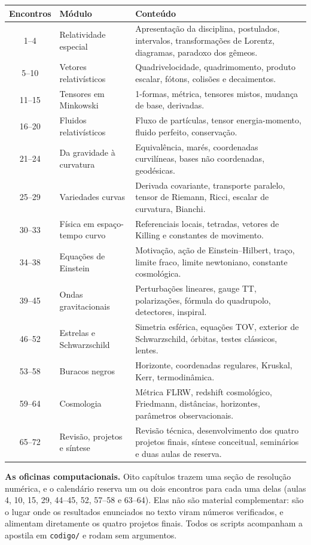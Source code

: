 \documentclass[12pt,a4paper,oneside]{book}
\theoremstyle{rgplain}
\theoremstyle{rgremark}
\begin{document}
\begin{center}
\small
\begin{tabular}{cp{3.1cm}p{8.1cm}}
\toprule
Encontros & Módulo & Conteúdo \\
\midrule
1--4 & Relatividade especial & Apresentação da disciplina, postulados, intervalos, transformações de Lorentz, diagramas, paradoxo dos gêmeos. \\
5--10 & Vetores relativísticos & Quadrivelocidade, quadrimomento, produto escalar, fótons, colisões e decaimentos. \\
11--15 & Tensores em Minkowski & 1-formas, métrica, tensores mistos, mudança de base, derivadas. \\
16--20 & Fluidos relativísticos & Fluxo de partículas, tensor energia-momento, fluido perfeito, conservação. \\
21--24 & Da gravidade à curvatura & Equivalência, marés, coordenadas curvilíneas, bases não coordenadas, geodésicas. \\
25--29 & Variedades curvas & Derivada covariante, transporte paralelo, tensor de Riemann, Ricci, escalar de curvatura, Bianchi. \\
30--33 & Física em espaço-tempo curvo & Referenciais locais, tetradas, vetores de Killing e constantes de movimento. \\
34--38 & Equações de Einstein & Motivação, ação de Einstein--Hilbert, traço, limite fraco, limite newtoniano, constante cosmológica. \\
39--45 & Ondas gravitacionais & Perturbações lineares, gauge TT, polarizações, fórmula do quadrupolo, detectores, inspiral. \\
46--52 & Estrelas e Schwarzschild & Simetria esférica, equações TOV, exterior de Schwarzschild, órbitas, testes clássicos, lentes. \\
53--58 & Buracos negros & Horizonte, coordenadas regulares, Kruskal, Kerr, termodinâmica. \\
59--64 & Cosmologia & Métrica FLRW, redshift cosmológico, Friedmann, distâncias, horizontes, parâmetros observacionais. \\
65--72 & Revisão, projetos e síntese & Revisão técnica, desenvolvimento dos quatro projetos finais, síntese conceitual, seminários e duas aulas de reserva. \\
\bottomrule
\end{tabular}
\end{center}

\begin{roteiro}
\textbf{As oficinas computacionais.} Oito capítulos trazem uma seção de
resolução numérica, e o calendário reserva um ou dois encontros para cada uma
delas (aulas 4, 10, 15, 29, 44--45, 52, 57--58 e 63--64). Elas não são material
complementar: são o lugar onde os resultados enunciados no texto viram números
verificados, e alimentam diretamente os quatro projetos finais. Todos os
scripts acompanham a apostila em \texttt{codigo/} e rodam sem argumentos.
\end{roteiro}
\end{document}
